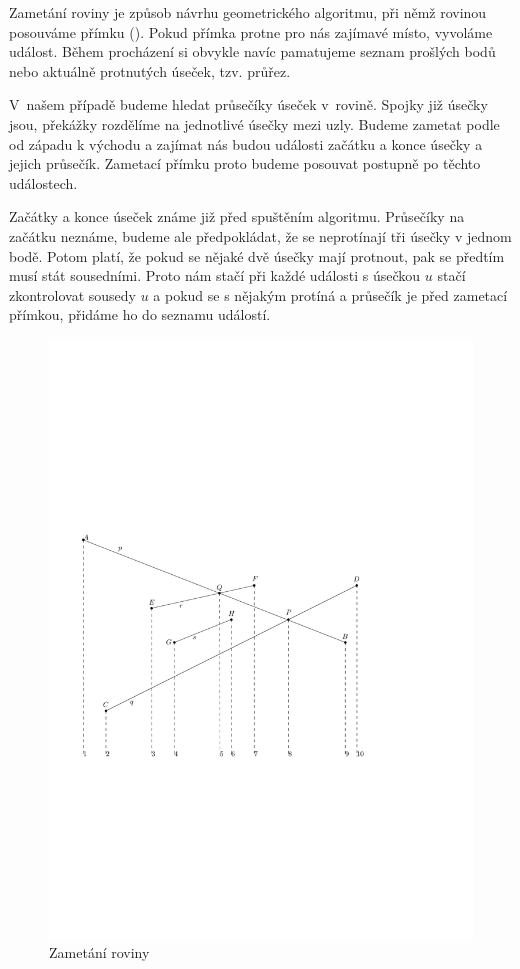 {\tuc Zametání roviny}\cite{zametani} je způsob návrhu geometrického algoritmu,
při němž rovinou posouváme přímku (). Pokud přímka protne pro nás
zajímavé místo, vyvoláme událost. Během procházení si obvykle navíc pamatujeme
seznam prošlých bodů nebo aktuálně protnutých úseček, tzv. {\tuc průřez}.

V~našem případě budeme hledat průsečíky úseček v~rovině. Spojky již úsečky jsou,
překážky rozdělíme na jednotlivé úsečky mezi uzly. Budeme zametat podle od
západu k východu a zajímat nás budou události začátku a konce úsečky a jejich
průsečík. Zametací přímku proto budeme posouvat postupně po těchto událostech.

Začátky a konce úseček známe již před spuštěním algoritmu. Průsečíky na začátku
neznáme, budeme ale předpokládat, že se neprotínají tři úsečky v jednom bodě.
Potom platí, že pokud se nějaké dvě úsečky mají protnout, pak se předtím musí
stát sousedními. Proto nám stačí při každé události s úsečkou $u$ stačí
zkontrolovat sousedy $u$ a pokud se s nějakým protíná a průsečík je před
zametací přímkou, přidáme ho do seznamu událostí.

\begin{figure}[h]
	\centering
	\includegraphics{../img/zametani.pdf}
	\caption{Zametání roviny}
	\label{fig:zametani}
\end{figure}

